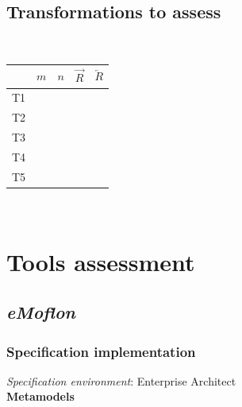 \documentclass{article}
\newcommand{\cmark}{\ding{51}}%
\begin{document}
\subsection{Transformations to assess}
~\\
\begin{center}
\begin{tabular}{| c | c | c | c | c | }
  \hline                        
   & $m$ & $n$ & $\overrightarrow{R}$ & $\overleftarrow{R}$ \\
  \hline 
  T1 & \nameref{sec:one-person} & \nameref{sec:two-employees} & \cmark & \\
  \hline
  T2 & \nameref{sec:one-person} & \nameref{sec:two-employees} & & \cmark \\
  \hline  
  T3 & \nameref{sec:two-persons} & \nameref{sec:two-employees} & \cmark &  \\
  \hline
  T4 & \nameref{sec:one-person} & \nameref{sec:no-employees} & \cmark &  \\
  \hline
  T5 & \nameref{sec:no-persons} & \nameref{sec:no-employees} & \cmark &  \\
  \hline  
\end{tabular}
\end{center}
~\\

\pagebreak
\section{Tools assessment}

\subsection{\textit{eMoflon}}

\subsubsection{Specification implementation}

\textit{Specification environment}: Enterprise Architect~\cite{EA}
~\\

\textbf{Metamodels}
\end{document}
